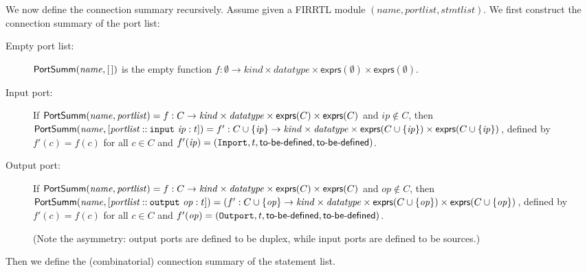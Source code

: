 \documentclass[a4paper]{article}
\newcommand{\portsem}{\mathsf{PortSumm}}
\newcommand{\expressions}{\mathsf{exprs}}
\newcommand{\emptylist}{[\,]}
\newcommand{\rconslist}[2]{[#1 \mathbin{::} #2]}
\newcommand{\needtobedefined}{\text{\textsf{to-be-defined}}}
\begin{document}
We now define the connection summary recursively.
Assume given a FIRRTL module $(\mathit{name}, \mathit{portlist}, \mathit{stmtlist})$.
We first construct the connection summary of the port list:
\begin{description}
\item[Empty port list:]
        $\portsem(\mathit{name}, \linebreak[0] \emptylist)$ is the empty function $f : \emptyset \to \mathit{kind} \times \mathit{datatype} \times \expressions(\emptyset) \times \expressions(\emptyset)$.

\item[Input port:]
	If $\portsem(\mathit{name}, \linebreak[0] \mathit{portlist}) = f: C \to \mathit{kind} \times \mathit{datatype} \times \expressions(C) \times \expressions(C)$
	and $\mathit{ip} \notin C$,
	then $\portsem(\mathit{name}, \linebreak[0] \rconslist{\mathit{portlist}}{\mathtt{input~} \mathit{ip} : t}) = f': C \cup \{ \mathit{ip} \} \to \mathit{kind} \times \mathit{datatype} \times \expressions(C \cup \{ \mathit{ip} \}) \times \expressions(C \cup \{ \mathit{ip} \})$,
	defined by $f'(c) = f(c)$ for all $c \in C$ and $f'(\mathit{ip}) = (\mathtt{Inport}, t, \linebreak[0] \needtobedefined, \linebreak[0] \needtobedefined)$.

\item[Output port:]
	If $\portsem(\mathit{name}, \linebreak[0] \mathit{portlist}) = f: C \to \mathit{kind} \times \mathit{datatype} \times \expressions(C) \times \expressions(C)$
	and $\mathit{op} \notin C$,
	then $\portsem(\mathit{name}, \linebreak[0] \rconslist{\mathit{portlist}}{\mathtt{output~} \mathit{op} : t}) = (f': C \cup \{ \mathit{op} \} \to \mathit{kind} \times \mathit{datatype} \times \expressions(C \cup \{ \mathit{op} \}) \times \expressions(C \cup \{ \mathit{op} \})$,
	defined by $f'(c) = f(c)$ for all $c \in C$ and $f'(\mathit{op}) = (\mathtt{Outport}, t, \linebreak[0] \needtobedefined, \linebreak[0] \needtobedefined)$.

	(Note the asymmetry: output ports are defined to be duplex, while input ports are defined to be sources.)
\end{description}
Then we define the (combinatorial) connection summary of the statement list.
\end{document}
